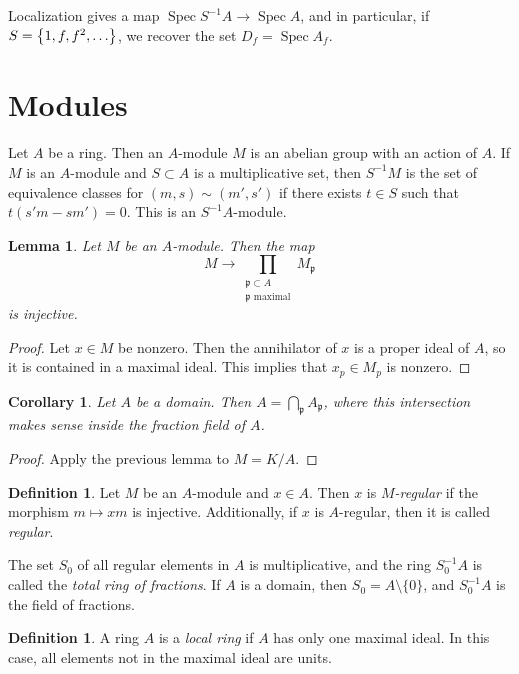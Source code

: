 \documentclass[leqno, openany]{memoir}
\newtheorem{cor}[thm]{Corollary}
\newtheorem{lem}[thm]{Lemma}
\theoremstyle{definition}
\newtheorem{defn}[thm]{Definition}
\theoremstyle{remark}
\theoremstyle{plain}
\theoremstyle{definition}
\theoremstyle{remark}
\newcommand{\mf}[1]{\mathfrak{#1}}
\DeclareMathOperator{\spec}{Spec}
\begin{document}
Localization gives a map $\spec S^{-1}A \to \spec A$, and in particular, if $S = \qty{1, f, f^2, \ldots}$, we recover the set $D_f = \spec A_f$.

\section{Modules}%
\label{sec:modules}

Let $A$ be a ring. Then an $A$-module $M$ is an abelian group with an action of $A$. If $M$ is an $A$-module and $S \subset A$ is a multiplicative set, then $S^{-1}M$ is the set of equivalence classes for $(m,s) \sim (m',s')$ if there exists $t \in S$ such that $t(s'm - sm') = 0$. This is an $S^{-1}A$-module.

\begin{lem}
    Let $M$ be an $A$-module. Then the map 
    \[ M \to \prod_{\substack{ \mf{p} \subset A \\ \mf{p} \text{ maximal}}} M_{\mf{p}} \]
    is injective.
\end{lem}

\begin{proof}
    Let $x \in M$ be nonzero. Then the annihilator of $x$ is a proper ideal of $A$, so it is contained in a maximal ideal. This implies that $x_p \in M_p$ is nonzero.
\end{proof}

\begin{cor}
    Let $A$ be a domain. Then $A = \bigcap_{\mf{p}} A_{\mf{p}}$, where this intersection makes sense inside the fraction field of $A$.
\end{cor}

\begin{proof}
    Apply the previous lemma to $M = K/A$.
\end{proof}

\begin{defn}
    Let $M$ be an $A$-module and $x \in A$. Then $x$ is \textit{$M$-regular} if the morphism $m \mapsto xm$ is injective. Additionally, if $x$ is $A$-regular, then it is called \textit{regular}.
\end{defn}

The set $S_0$ of all regular elements in $A$ is multiplicative, and the ring $S_0^{-1}A$ is called the \textit{total ring of fractions}. If $A$ is a domain, then $S_0 = A \setminus \{0 \}$, and $S_0^{-1}A$ is the field of fractions.

\begin{defn}
    A ring $A$ is a \textit{local ring} if $A$ has only one maximal ideal. In this case, all elements not in the maximal ideal are units.
\end{defn}
\end{document}
